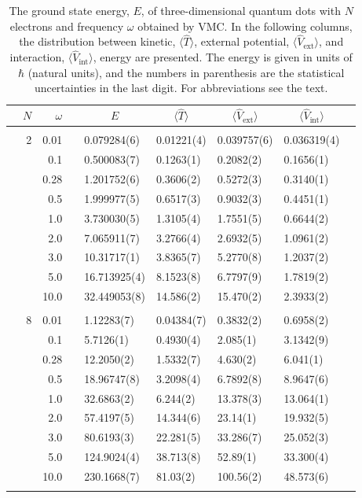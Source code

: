 \begin{table}[H]
	\caption{The ground state energy, $E$, of three-dimensional quantum dots with $N$ electrons and frequency $\omega$ obtained by VMC. In the following columns, the distribution between kinetic, $\langle\hat{T}\rangle$, external potential, $\langle\hat{V}_{\text{ext}}\rangle$, and interaction, $\langle\hat{V}_{\text{int}}\rangle$, energy are presented. The energy is given in units of $\hbar$ (natural units), and the numbers in parenthesis are the statistical uncertainties in the last digit. For abbreviations see the text.}
	\label{tab:splitfrequencyQDVMC3D}
	\begin{tabularx}{\textwidth}{R{1cm}rrcR{2.3cm}R{2.3cm}R{2.3cm}R{2.3cm}R{1cm}} \hline\hline
		\makecell{\\ \phantom{$N$}} & $N$ & $\omega$ &&  &  &  &  & \\ \hline \\
		&2 & 0.01 && 0.079284(6) & 0.01221(4) & 0.039757(6) & 0.036319(4) \\
		&& 0.1 && 0.500083(7) & 0.1263(1) & 0.2082(2) & 0.1656(1) \\
		&& 0.28 && 1.201752(6) & 0.3606(2) & 0.5272(3) & 0.3140(1) \\
		&& 0.5 && 1.999977(5) & 0.6517(3) & 0.9032(3) & 0.4451(1) \\
		&& 1.0 && 3.730030(5) & 1.3105(4) & 1.7551(5) & 0.6644(2) \\
		&& 2.0 && 7.065911(7) & 3.2766(4) & 2.6932(5) & 1.0961(2) \\
		&& 3.0 && 10.31717(1) & 3.8365(7) & 5.2770(8) & 1.2037(2) \\ 
		&& 5.0 && 16.713925(4) & 8.1523(8) & 6.7797(9) & 1.7819(2) \\
		&& 10.0 && 32.449053(8) & 14.586(2) & 15.470(2) & 2.3933(2) \\
		\hline \\
		
		&8 & 0.01 && 1.12283(7) & 0.04384(7) & 0.3832(2) & 0.6958(2) \\
		&& 0.1 && 5.7126(1) & 0.4930(4) & 2.085(1) & 3.1342(9) \\
		&& 0.28 && 12.2050(2) & 1.5332(7) & 4.630(2) & 6.041(1) \\
		&& 0.5 && 18.96747(8) & 3.2098(4) & 6.7892(8) & 8.9647(6) \\
		&& 1.0 && 32.6863(2) & 6.244(2) & 13.378(3) & 13.064(1) \\
		&& 2.0 && 57.4197(5) & 14.344(6) & 23.14(1) & 19.932(5) \\
		&& 3.0 && 80.6193(3) & 22.281(5) & 33.286(7) & 25.052(3) \\ 
		&& 5.0 && 124.9024(4) & 38.713(8) & 52.89(1) & 33.300(4) \\
		&& 10.0 && 230.1668(7) & 81.03(2) & 100.56(2) & 48.573(6) \\
		\hline \\
		

\end{tabularx}
\end{table}
